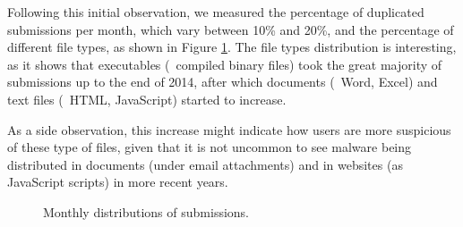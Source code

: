 Following this initial observation, we measured the percentage of duplicated submissions per month, which vary between 10\% and 20\%, and the percentage of different file types, as shown in Figure \ref{fig:monthly_distributions}.
The file types distribution is interesting, as it shows that executables (\ie\ compiled binary files) took the great majority of submissions up to the end of 2014, after which documents (\eg\ Word, Excel) and text files (\eg\ HTML, JavaScript) started to increase.

As a side observation, this increase might indicate how users are more suspicious of these type of files, given that it is not uncommon to see malware being distributed in documents (under email attachments) and in websites (as JavaScript scripts) in more recent years.

\begin{figure}[!htb]
	\centering
	\begin{subfigmatrix}{2}
	\end{subfigmatrix}
	\caption[Monthly distributions of submissions.]{Monthly distributions of submissions.}
	\label{fig:monthly_distributions}
\end{figure}

